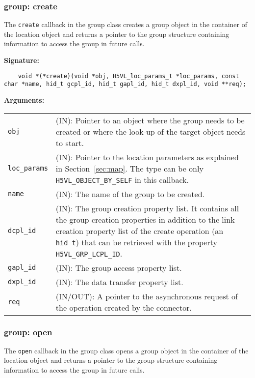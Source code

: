 \subsubsection{group: create}
The \texttt{create} callback in the group class creates a group
object in the container of the location object and returns a pointer
to the group structure containing information to access the group in
future calls.\bigskip

\begin{mdframed}[style=bgbox]
\textbf{Signature:}
\begin{lstlisting}
    void *(*create)(void *obj, H5VL_loc_params_t *loc_params, const char *name, hid_t gcpl_id, hid_t gapl_id, hid_t dxpl_id, void **req);
\end{lstlisting}

\textbf{Arguments:}\\
\begin{tabular}{l p{13.5cm}}
  \texttt{obj} & (IN): Pointer to an object where the group needs
  to be created or where the look-up of the target object needs to
  start.\\
  \texttt{loc\_params} & (IN): Pointer to the location parameters as explained in
  Section~\ref{sec:map}. The type can be only \texttt{H5VL\_OBJECT\_BY\_SELF} in this callback. \\
  \texttt{name} & (IN): The name of the group to be created.\\
  \texttt{dcpl\_id} & (IN): The group creation property list. It contains
  all the group creation properties in addition to the link creation
  property list of the create operation (an \texttt{hid\_t}) that can be
  retrieved with the property \texttt{H5VL\_GRP\_LCPL\_ID}.\\
  \texttt{gapl\_id} & (IN): The group access property list.\\
  \texttt{dxpl\_id} & (IN): The data transfer property list.\\
  \texttt{req} & (IN/OUT): A pointer to the asynchronous request of the
  operation created by the connector.\\
\end{tabular}
\end{mdframed}

\subsubsection{group: open}
The \texttt{open} callback in the group class opens a group object
in the container of the location object and returns a pointer to the
group structure containing information to access the group in future
calls.\bigskip

